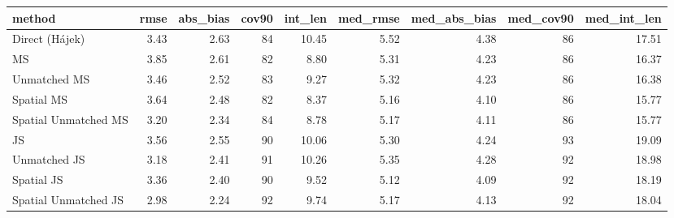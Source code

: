
\begin{tabular}{lrrrrrrrr}
\toprule
method & rmse & abs\_bias & cov90 & int\_len & med\_rmse & med\_abs\_bias & med\_cov90 & med\_int\_len\\
\midrule
Direct (Hájek) & 3.43 & 2.63 & 84 & 10.45 & 5.52 & 4.38 & 86 & 17.51\\
MS & 3.85 & 2.61 & 82 & 8.80 & 5.31 & 4.23 & 86 & 16.37\\
Unmatched MS & 3.46 & 2.52 & 83 & 9.27 & 5.32 & 4.23 & 86 & 16.38\\
Spatial MS & 3.64 & 2.48 & 82 & 8.37 & 5.16 & 4.10 & 86 & 15.77\\
Spatial Unmatched MS & 3.20 & 2.34 & 84 & 8.78 & 5.17 & 4.11 & 86 & 15.77\\
JS & 3.56 & 2.55 & 90 & 10.06 & 5.30 & 4.24 & 93 & 19.09\\
Unmatched JS & 3.18 & 2.41 & 91 & 10.26 & 5.35 & 4.28 & 92 & 18.98\\
Spatial JS & 3.36 & 2.40 & 90 & 9.52 & 5.12 & 4.09 & 92 & 18.19\\
Spatial Unmatched JS & 2.98 & 2.24 & 92 & 9.74 & 5.17 & 4.13 & 92 & 18.04\\
\bottomrule
\end{tabular}
